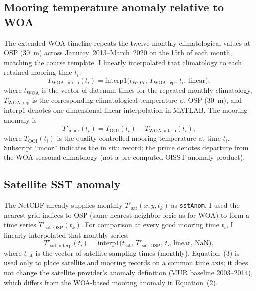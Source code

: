 \documentclass[11pt,letterpaper]{article}
\begin{document}
\subsection{Mooring temperature anomaly relative to WOA}
The extended WOA timeline repeats the twelve monthly climatological values at OSP (\SI{30}{\meter}) across January~2013--March~2020 on the 15th of each month, matching the course template. I linearly interpolated that climatology to each retained mooring time $t_i$:
\begin{equation}
  T_{\mathrm{WOA,interp}}(t_i) = \mathrm{interp1}\bigl(t_{\mathrm{WOA}},\, T_{\mathrm{WOA,rep}},\, t_i,\, \text{linear}\bigr),
\end{equation}
where $t_{\mathrm{WOA}}$ is the vector of datenum times for the repeated monthly climatology, $T_{\mathrm{WOA,rep}}$ is the corresponding climatological temperature at OSP (\SI{30}{\meter}), and $\mathrm{interp1}$ denotes one-dimensional linear interpolation in MATLAB. The mooring anomaly is
\begin{equation}
  T'_{\mathrm{moor}}(t_i) = T_{\mathrm{OOI}}(t_i) - T_{\mathrm{WOA,interp}}(t_i),
\end{equation}
where $T_{\mathrm{OOI}}(t_i)$ is the quality-controlled mooring temperature at time $t_i$. Subscript ``moor'' indicates the in situ record; the prime denotes departure from the WOA seasonal climatology (not a pre-computed OISST anomaly product).

\subsection{Satellite SST anomaly}
\label{sec:sat_anom}
The NetCDF already supplies monthly $T'_{\mathrm{sat}}(x,y,t_k)$ as \texttt{sstAnom}. I used the nearest grid indices to OSP (same nearest-neighbor logic as for WOA) to form a time series $T'_{\mathrm{sat,OSP}}(t_k)$. For comparison at every good mooring time $t_i$, I linearly interpolated that monthly series:
\begin{equation}
  T'_{\mathrm{sat,interp}}(t_i) = \mathrm{interp1}\bigl(t_{\mathrm{sat}},\, T'_{\mathrm{sat,OSP}},\, t_i,\, \text{linear},\, \mathrm{NaN}\bigr),
\end{equation}
where $t_{\mathrm{sat}}$ is the vector of satellite sampling times (monthly). Equation~(3) is used only to place satellite and mooring records on a common time axis; it does not change the satellite provider's anomaly definition (MUR baseline 2003--2014), which differs from the WOA-based mooring anomaly in Equation~(2).
\end{document}
